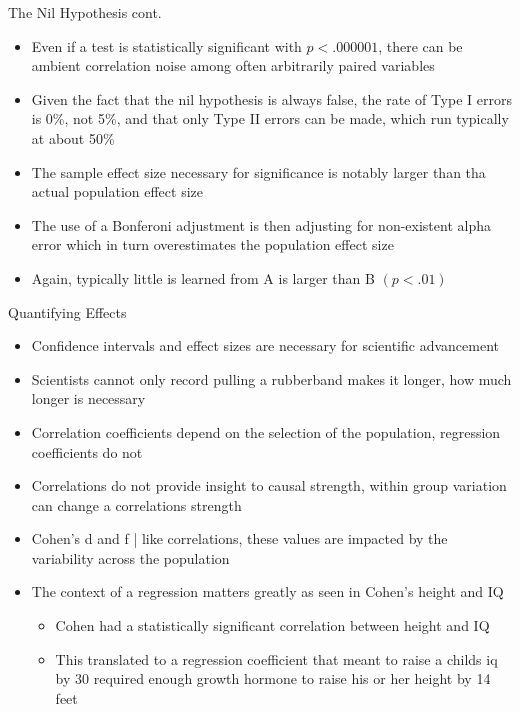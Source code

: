 \documentclass[aspectratio=169, 12pt]{beamer}
\begin{document}
\begin{frame}{The Nil Hypothesis cont.}
  \begin{itemize}
  \item Even if a test is statistically significant with $p < .000001$, there can be ambient correlation noise among often arbitrarily paired variables %
  \item Given the fact that the nil hypothesis is always false, the rate of Type I errors is 0\%, not 5\%, and that only Type II errors can be made, which run typically at about 50\%
  \item The sample effect size necessary for significance is notably larger than tha actual population effect size 
  \item The use of a Bonferoni adjustment is then adjusting for non-existent alpha error which in turn overestimates the population effect size %
  \item Again, typically little is learned from A is larger than B $(p < .01)$ %
  \end{itemize}
\end{frame}

\begin{frame}{Quantifying Effects}
  \begin{itemize}
  \item Confidence intervals and effect sizes are necessary for scientific advancement
  \item Scientists cannot only record pulling a rubberband makes it longer, how much longer is necessary %
  \item Correlation coefficients depend on the selection of the population, regression coefficients do not %
  \item Correlations do not provide insight to causal strength, within group variation can change a correlations strength %
  \item Cohen's d and f | like correlations, these values are impacted by the variability across the population %
  \item The context of a regression matters greatly as seen in Cohen's height and IQ 
    \begin{itemize}
    \item Cohen had a statistically significant correlation between height and IQ
    \item This translated to a regression coefficient that meant to raise a childs iq by 30 required enough growth hormone to raise his or her height by 14 feet
    \end{itemize}
  \end{itemize}
\end{frame}
\end{document}
